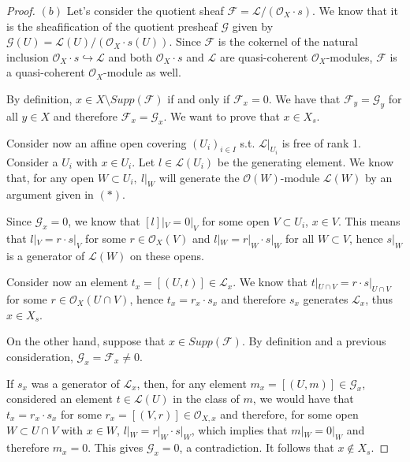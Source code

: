 \documentclass{article}
\begin{document}
\begin{proof}
    $(b)$ Let's consider the quotient sheaf $\mathcal{F}=
    \mathcal{L}/(\mathcal{O}_X\cdot s)$. We know that it is the sheafification
    of the quotient presheaf $\mathcal{G}$ given by
    $\mathcal{G}(U)=\mathcal{L}(U)/(\mathcal{O}_X\cdot s(U))$. Since
    $\mathcal{F}$ is the cokernel of the natural inclusion $\mathcal{O}_X\cdot
    s\hookrightarrow\mathcal{L}$ and both $\mathcal{O}_X\cdot s$ and
    $\mathcal{L}$ are quasi-coherent $\mathcal{O}_X$-modules, $\mathcal{F}$ is a
    quasi-coherent $\mathcal{O}_X$-module as well.

    By definition, $x\in X\setminus Supp(\mathcal{F})$ if and only if
    $\mathcal{F}_x=0$. We have that $\mathcal{F}_y=\mathcal{G}_y$ for all
    $y\in X$ and therefore $\mathcal{F}_x=\mathcal{G}_x$. We want to prove that
    $x\in X_s$.

    Consider now an affine open covering $(U_i)_{i\in I}$ s.t.
    $\mathcal{L}|_{U_i}$ is free of rank 1. Consider a $U_i$ with $x\in U_i$.
    Let $l\in\mathcal{L}(U_i)$ be the generating element. We know that, for any
    open $W\subset U_i,\ l|_W$ will generate the $\mathcal{O}(W)$-module
    $\mathcal{L}(W)$ by an argument given in $(*)$.

    Since $\mathcal{G}_x=0$, we know that
    $[l]|_V=0|_V$ for some open $V\subset U_i$, $x\in V$. This means that
    $l|_V=r\cdot s|_V$ for some $r\in\mathcal{O}_X(V)$ and $l|_W=r|_W\cdot
    s|_W$ for all $W\subset V$, hence $s|_{W}$ is a generator of
    $\mathcal{L}(W)$ on these opens.
    
    Consider now an element $t_x=[(U,t)]\in\mathcal{L}_x$. We know that
    $t|_{U\cap V}=r\cdot s|_{U\cap V}$ for some $r\in\mathcal{O}_X(U\cap V)$,
    hence $t_x=r_x\cdot s_x$ and therefore $s_x$ generates $\mathcal{L}_x$, thus
    $x\in X_s$.

    On the other hand, suppose that $x\in Supp(\mathcal{F})$. By definition and
    a previous consideration, $\mathcal{G}_x=\mathcal{F}_x\neq 0$.

    If $s_x$ was a generator of $\mathcal{L}_x$, then, for any element
    $m_x=[(U,m)]\in\mathcal{G}_x$, considered an element $t\in\mathcal{L}(U)$ in
    the class of $m$, we would have that $t_x=r_x\cdot s_x$ for some
    $r_x=[(V,r)]\in\mathcal{O}_{X,x}$ and therefore, for some open $W\subset
    U\cap V$ with $x\in W$, $l|_W=r|_W\cdot s|_W$, which implies that
    $m|_W=0|_W$ and therefore $m_x=0$. This gives $\mathcal{G}_x=0$, a
    contradiction. It follows that $x\not\in X_s$.


\end{proof}
\end{document}
